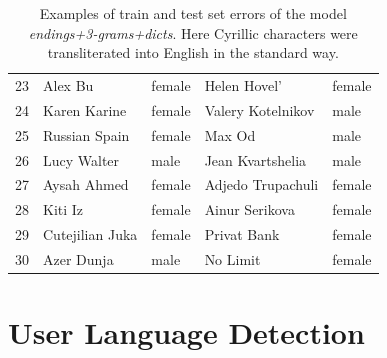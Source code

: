 \documentclass{beamer}
\begin{document}
{\begin{table}[h]
\begin{center}
\begin{tabular}{|l|ll|ll|}
23 & Alex Bu  & female & Helen Hovel' & female \\  
24 & Karen Karine & female & Valery Kotelnikov & male \\  
25 & Russian Spain & female & Max Od & male \\  
26 & Lucy Walter & male & Jean Kvartshelia & male \\  
27 & Aysah Ahmed & female & Adjedo Trupachuli & female \\  
28 & Kiti Iz  & female & Ainur Serikova & female \\  
29 & Cutejilian Juka  & female & Privat Bank & female \\  
30 & Azer Dunja  & male & No Limit & female \\  
\hline
\end{tabular}
\end{center}
\caption{ Examples of train and test set errors of the model \textit{endings+3-grams+dicts}. Here Cyrillic characters were transliterated into English in the standard way. }
\label{tab:errors}
\end{table}
}



\section[User Language]{ User Language Detection }
\subsection{}

\end{document}

